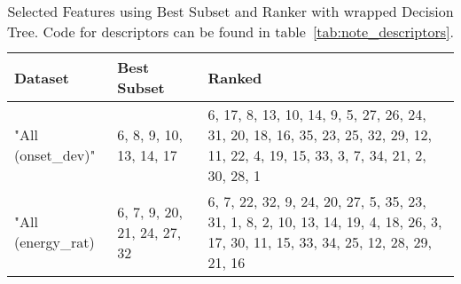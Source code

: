 \begin{table}[ht!]
\centering
 
  \begin{tabular}{  l l p{6cm} }
    \hline
    Dataset & Best Subset & Ranked \\ \hline
    "All (onset\_dev)" & 6, 8, 9, 10, 13, 14, 17 &  6, 17, 8, 13, 10, 14, 9, 5, 27, 26, 24, 31, 20, 18, 16, 35, 23, 25, 32, 29, 12, 11, 22, 4, 19, 15, 33, 3, 7, 34, 21, 2, 30, 28, 1 \\
    "All (energy\_rat) & 6, 7, 9, 20, 21, 24, 27, 32 & 6, 7, 22, 32, 9, 24, 20, 27, 5, 35, 23, 31, 1, 8, 2, 10, 13, 14, 19, 4, 18, 26, 3, 17, 30, 11, 15, 33, 34, 25, 12, 28, 29, 21, 16  \\
    
    \hline
  \end{tabular}

 \caption[Selected Features using Ranker and Best Subset with wrapped Decision Tree]{Selected Features using Best Subset and Ranker with wrapped Decision Tree. Code for descriptors can be found in table~\ref{tab:note_descriptors}.}
  \label{tab:feature_selection}

\end{table}
